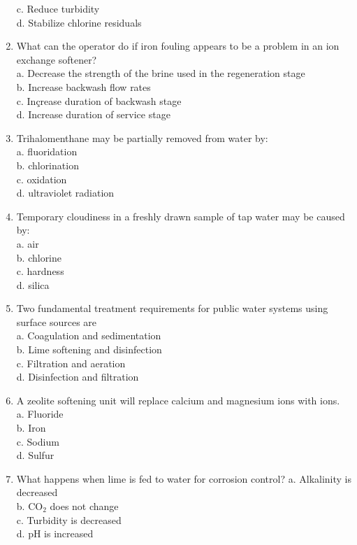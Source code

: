 \begin{enumerate}
c. Reduce turbidity\\
d. Stabilize chlorine residuals\\
\item What can the operator do if iron fouling appears to be a problem in an ion exchange softener?\\
a. Decrease the strength of the brine used in the regeneration stage\\
b. Increase backwash flow rates\\
c. Inçrease duration of backwash stage\\
d. Increase duration of service stage\\
\item Trihalomenthane may be partially removed from water by:\\
a. fluoridation\\
b. chlorination\\
c. oxidation\\
d. ultraviolet radiation\\
\item Temporary cloudiness in a freshly drawn sample of tap water may be caused by:\\
a. air\\
b. chlorine\\
c. hardness\\
d. silica\\
\item Two fundamental treatment requirements for public water systems using surface sources are\\
a. Coagulation and sedimentation\\
b. Lime softening and disinfection\\
c. Filtration and aeration\\
d. Disinfection and filtration\\
\item A zeolite softening unit will replace calcium and magnesium ions with ions.\\
a. Fluoride\\
b. Iron\\
c. Sodium\\
d. Sulfur\\
\item What happens when lime is fed to water for corrosion control?
a. Alkalinity is decreased\\
b. $\mathrm{CO}_{2}$ does not change\\
c. Turbidity is decreased\\
d. $\mathrm{pH}$ is increased\\

\end{enumerate}
